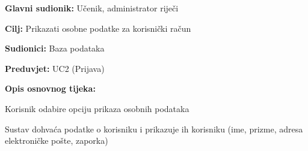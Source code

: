 				\noindent {}
				\begin{packed_item}
					
					\item \textbf{Glavni sudionik: }Učenik, administrator riječi
					\item  \textbf{Cilj:} Prikazati osobne podatke za korisnički račun
					\item  \textbf{Sudionici:} Baza podataka
					\item  \textbf{Preduvjet:} UC2 (Prijava)
					\item  \textbf{Opis osnovnog tijeka:}
					
					\item[] \begin{packed_enum}
						
						\item Korisnik odabire opciju prikaza osobnih podataka
						\item Sustav dohvaća podatke o korisniku i prikazuje ih korisniku (ime, prizme, adresa elektroničke pošte, zaporka) 
						
					\end{packed_enum}
					
				\end{packed_item}
				
